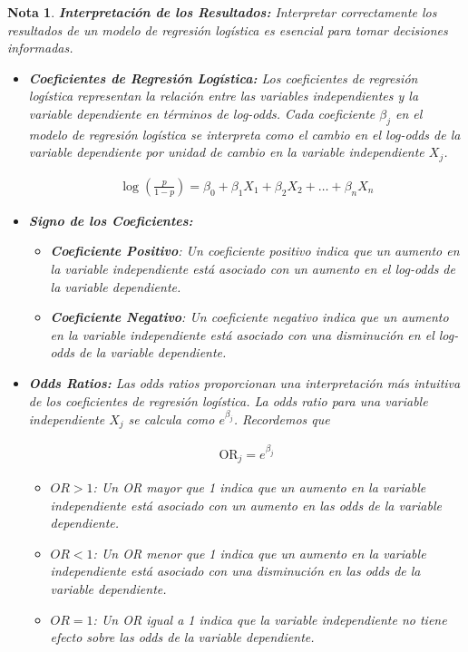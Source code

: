 \documentclass[12pt]{article}
\newtheorem{Note}{Nota}%
\begin{document}
\begin{Note}

\textbf{Interpretación de los Resultados:} Interpretar correctamente los resultados de un modelo de regresi\'on log\'istica es esencial para tomar decisiones informadas. 
\begin{itemize}

\item \textbf{Coeficientes de Regresi\'on Log\'istica:} Los coeficientes de regresi\'on log\'istica representan la relaci\'on entre las variables independientes y la variable dependiente en t\'erminos de log-odds.  Cada coeficiente $\beta_j$ en el modelo de regresi\'on log\'istica se interpreta como el cambio en el log-odds de la variable dependiente por unidad de cambio en la variable independiente $X_j$.

\begin{eqnarray*}
\log\left(\frac{p}{1-p}\right) = \beta_0 + \beta_1 X_1 + \beta_2 X_2 + \ldots + \beta_n X_n
\end{eqnarray*}

\item \textbf{Signo de los Coeficientes:}\medskip

\begin{itemize}
    \item \textbf{Coeficiente Positivo}: Un coeficiente positivo indica que un aumento en la variable independiente est\'a asociado con un aumento en el log-odds de la variable dependiente.
    \item \textbf{Coeficiente Negativo}: Un coeficiente negativo indica que un aumento en la variable independiente est\'a asociado con una disminuci\'on en el log-odds de la variable dependiente.
\end{itemize}

\item \textbf{Odds Ratios:} Las odds ratios proporcionan una interpretaci\'on m\'as intuitiva de los coeficientes de regresi\'on log\'istica. La odds ratio para una variable independiente $X_j$ se calcula como $e^{\beta_j}$. Recordemos que 

\begin{eqnarray*}
\text{OR}_j = e^{\beta_j}
\end{eqnarray*}

\begin{itemize}
    \item $OR > 1$: Un OR mayor que 1 indica que un aumento en la variable independiente est\'a asociado con un aumento en las odds de la variable dependiente.
    \item $OR < 1$: Un OR menor que 1 indica que un aumento en la variable independiente est\'a asociado con una disminuci\'on en las odds de la variable dependiente.
    \item $OR = 1$: Un OR igual a 1 indica que la variable independiente no tiene efecto sobre las odds de la variable dependiente.
\end{itemize}


\end{itemize}
\end{Note}
\end{document}
